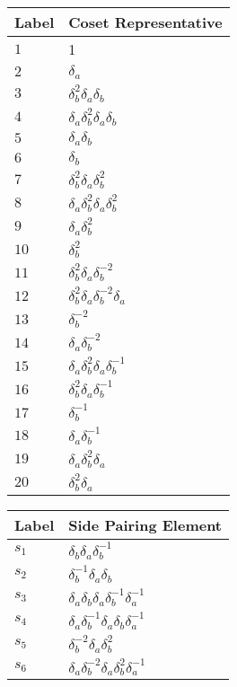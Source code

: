 \documentclass{article}
\begin{document}
\begin{center}
\begin{tabular}{ll}
\toprule
Label & Coset Representative\\
\midrule
$1$ & 1 \\
$2$ & $\delta_a^{}$ \\
$3$ & $\delta_b^{2}\delta_a^{}\delta_b^{}$ \\
$4$ & $\delta_a^{}\delta_b^{2}\delta_a^{}\delta_b^{}$ \\
$5$ & $\delta_a^{}\delta_b^{}$ \\
$6$ & $\delta_b^{}$ \\
$7$ & $\delta_b^{2}\delta_a^{}\delta_b^{2}$ \\
$8$ & $\delta_a^{}\delta_b^{2}\delta_a^{}\delta_b^{2}$ \\
$9$ & $\delta_a^{}\delta_b^{2}$ \\
$10$ & $\delta_b^{2}$ \\
$11$ & $\delta_b^{2}\delta_a^{}\delta_b^{-2}$ \\
$12$ & $\delta_b^{2}\delta_a^{}\delta_b^{-2}\delta_a^{}$ \\
$13$ & $\delta_b^{-2}$ \\
$14$ & $\delta_a^{}\delta_b^{-2}$ \\
$15$ & $\delta_a^{}\delta_b^{2}\delta_a^{}\delta_b^{-1}$ \\
$16$ & $\delta_b^{2}\delta_a^{}\delta_b^{-1}$ \\
$17$ & $\delta_b^{-1}$ \\
$18$ & $\delta_a^{}\delta_b^{-1}$ \\
$19$ & $\delta_a^{}\delta_b^{2}\delta_a^{}$ \\
$20$ & $\delta_b^{2}\delta_a^{}$ \\
\bottomrule
\end{tabular}
\hfill
\begin{tabular}{ll}
\toprule
Label & Side Pairing Element\\
\midrule
$s_{1}$ & $\delta_b^{}\delta_a^{}\delta_b^{-1}$ \\
$s_{2}$ & $\delta_b^{-1}\delta_a^{}\delta_b^{}$ \\
$s_{3}$ & $\delta_a^{}\delta_b^{}\delta_a^{}\delta_b^{-1}\delta_a^{-1}$ \\
$s_{4}$ & $\delta_a^{}\delta_b^{-1}\delta_a^{}\delta_b^{}\delta_a^{-1}$ \\
$s_{5}$ & $\delta_b^{-2}\delta_a^{}\delta_b^{2}$ \\
$s_{6}$ & $\delta_a^{}\delta_b^{-2}\delta_a^{}\delta_b^{2}\delta_a^{-1}$ \\

\end{tabular}
\end{center}
\end{document}
